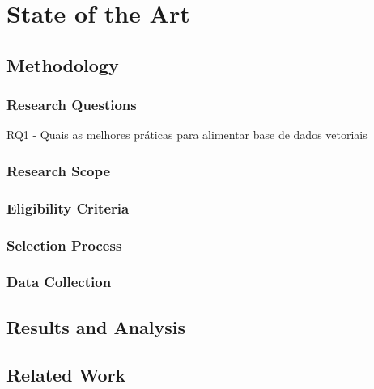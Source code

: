 
\chapter{State of the Art} %
\label{chap:Chapter3} 

\section{Methodology}

\subsection{Research Questions}

 RQ1 - Quais as melhores práticas para alimentar base de dados vetoriais


\subsection{Research Scope}

\subsection{Eligibility Criteria}


\subsection{Selection Process}

\subsection{Data Collection}

\section{Results and Analysis}

\section{Related Work}





